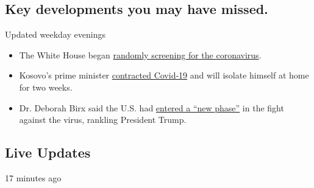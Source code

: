\hypertarget{key-developments-you-may-have-missed}{%
\subsection{Key developments you may have
missed.}\label{key-developments-you-may-have-missed}}

Updated weekday evenings

\begin{itemize}
\tightlist
\item
  The White House began
  \href{https://www.nytimes3xbfgragh.onion/2020/08/03/world/coronavirus-covid-19.html\#link-c4a1d71}{randomly
  screening for the coronavirus}.
\item
  Kosovo's prime minister
  \href{https://nl.nytimes3xbfgragh.onion/f/a/umYjgHqFQS0DWGLnViksGQ~~/AAAAAQA~/RgRhCxH_P4QgAWh0dHBzOi8vd3d3LnJldXRlcnMuY29tL2FydGljbGUvdXMtaGVhbHRoLWNvcm9uYXZpcnVzLWtvc292by1wcmltZW1pbmlzdC9rb3Nvdm8tcHJpbWUtbWluaXN0ZXItc2F5cy1oZS1oYXMtY292aWQtMTktaWRVU0tCTjI0WTBPTj9jYW1wYWlnbl9pZD0xNTQmZW1jPWVkaXRfY2JfMjAyMDA4MDMmaW5zdGFuY2VfaWQ9MjA5NDQmbmw9Y29yb25hdmlydXMtYnJpZWZpbmcmcmVnaV9pZD0zNTQ2NDU0MSZzZWdtZW50X2lkPTM1MTI5JnRlPTEmdXNlcl9pZD02Njg0MjBkMWQ1MGVjZTM5ZTdlNGNkYmRkYzAxOTZkMFcDbnl0QgoAMv-MKF_UfRy_UhhrYXJlbi5iYXJyb3dAbnl0aW1lcy5jb21YBAAAAAA~}{contracted
  Covid-19} and will isolate himself at home for two weeks.
\item
  Dr. Deborah Birx said the U.S. had
  \href{https://www.nytimes3xbfgragh.onion/2020/08/03/world/coronavirus-covid-19.html}{entered
  a ``new phase''} in the fight against the virus, rankling President
  Trump.
\end{itemize}

\hypertarget{live-updates}{%
\subsection{Live Updates}\label{live-updates}}

17 minutes ago

